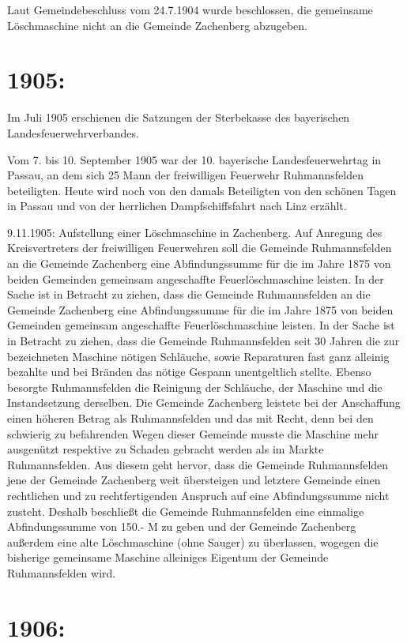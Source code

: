 \documentclass[12pt,a4paper]{book}
\begin{document}
Laut Gemeindebeschluss vom 24.7.1904 wurde beschlossen, die gemeinsame
Löschmaschine nicht an die Gemeinde Zachenberg abzugeben.

\section{1905:}

Im Juli 1905 erschienen die Satzungen der Sterbekasse des bayerischen
Landesfeuerwehrverbandes.

Vom 7. bis 10. September 1905 war der 10. bayerische Landesfeuerwehrtag in
Passau, an dem sich 25 Mann der freiwilligen Feuerwehr Ruhmannsfelden
beteiligten. Heute wird noch von den damals Beteiligten von den schönen Tagen in
Passau und von der herrlichen Dampfschiffsfahrt nach Linz erzählt.

9.11.1905: Aufstellung einer Löschmaschine in Zachenberg. Auf Anregung des
Kreisvertreters der freiwilligen Feuerwehren soll die Gemeinde Ruhmannsfelden an
die Gemeinde Zachenberg eine Abfindungssumme für die im Jahre 1875 von beiden
Gemeinden gemeinsam angeschaffte Feuerlöschmaschine leisten. In der Sache ist in
Betracht zu ziehen, dass die Gemeinde Ruhmannsfelden an die Gemeinde Zachenberg
eine Abfindungssumme für die im Jahre 1875 von beiden Gemeinden gemeinsam
angeschaffte Feuerlöschmaschine leisten. In der Sache ist in Betracht zu ziehen,
dass die Gemeinde Ruhmannsfelden seit 30 Jahren die zur bezeichneten Maschine
nötigen Schläuche, sowie Reparaturen fast ganz alleinig bezahlte und bei Bränden
das nötige Gespann unentgeltlich stellte. Ebenso besorgte Ruhmannsfelden die
Reinigung der Schläuche, der Maschine und die Instandsetzung derselben. Die
Gemeinde Zachenberg leistete bei der Anschaffung einen höheren Betrag als
Ruhmannsfelden und das mit Recht, denn bei den schwierig zu befahrenden Wegen
dieser Gemeinde musste die Maschine mehr ausgenützt respektive zu Schaden
gebracht werden als im Markte Ruhmannsfelden. Aus diesem geht hervor, dass die
Gemeinde Ruhmannsfelden jene der Gemeinde Zachenberg weit übersteigen und
letztere Gemeinde einen rechtlichen und zu rechtfertigenden Anspruch auf eine
Abfindungssumme nicht zusteht. Deshalb beschließt die Gemeinde Ruhmannsfelden
eine einmalige Abfindungssumme von 150.- M zu geben und der Gemeinde Zachenberg
außerdem eine alte Löschmaschine (ohne Sauger) zu überlassen, wogegen die
bisherige gemeinsame Maschine alleiniges Eigentum der Gemeinde Ruhmannsfelden
wird.

\section{1906:}
\end{document}
